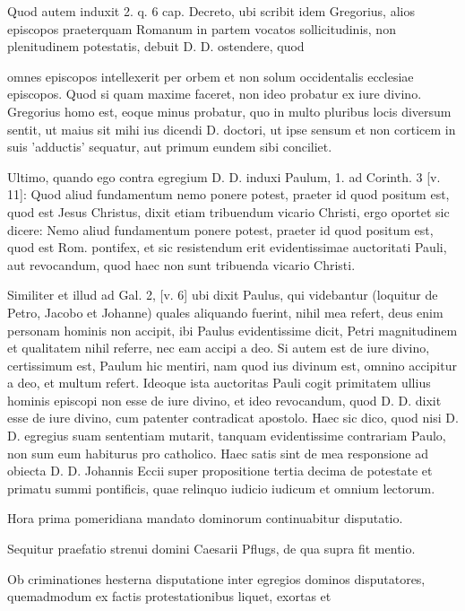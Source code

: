 Quod autem induxit 2. q. 6 cap. Decreto, ubi scribit idem Gregorius, alios episcopos praeterquam Romanum in partem vocatos sollicitudinis, non plenitudinem potestatis, debuit D. D. ostendere, quod

omnes episcopos intellexerit per orbem et non solum occidentalis ecclesiae episcopos. Quod si quam maxime faceret, non ideo probatur ex iure divino. Gregorius homo est, eoque minus probatur, quo in multo pluribus locis diversum sentit, ut maius sit mihi ius dicendi D. doctori, ut ipse sensum et non corticem in suis 'adductis' sequatur, aut primum eundem sibi conciliet.

Ultimo, quando ego contra egregium D. D. induxi Paulum, 1. ad Corinth. 3 [v. 11]: Quod aliud fundamentum nemo ponere potest, praeter id quod positum est, quod est Jesus Christus, dixit etiam tribuendum vicario Christi, ergo oportet sic dicere: Nemo aliud fundamentum ponere potest, praeter id quod positum est, quod est Rom. pontifex, et sic resistendum erit evidentissimae auctoritati Pauli, aut revocandum, quod haec non sunt tribuenda vicario Christi.

Similiter et illud ad Gal. 2, [v. 6] ubi dixit Paulus, qui videbantur (loquitur de Petro, Jacobo et Johanne) quales aliquando fuerint, nihil mea refert, deus enim personam hominis non accipit, ibi Paulus evidentissime dicit, Petri magnitudinem et qualitatem nihil referre, nec eam accipi a deo. Si autem \marginpar{\small[290]} est de iure divino, certissimum est, Paulum hic mentiri, nam quod ius divinum est, omnino accipitur a deo, et multum refert. Ideoque ista auctoritas Pauli cogit primitatem ullius hominis episcopi non esse de iure divino, et ideo revocandum, quod D. D. dixit esse de iure divino, cum patenter contradicat apostolo. Haec sic dico, quod nisi D. D. egregius suam sententiam mutarit, tanquam evidentissime contrariam Paulo, non sum eum habiturus pro catholico. Haec satis sint de mea responsione ad obiecta D. D. Johannis Eccii super propositione tertia decima de potestate et primatu summi pontificis, quae relinquo iudicio iudicum et omnium lectorum.

Hora prima pomeridiana mandato dominorum continuabitur disputatio.

Sequitur praefatio strenui domini Caesarii Pflugs, de qua supra fit mentio.

Ob criminationes hesterna disputatione inter egregios dominos disputatores, quemadmodum ex factis protestationibus liquet, exortas et

